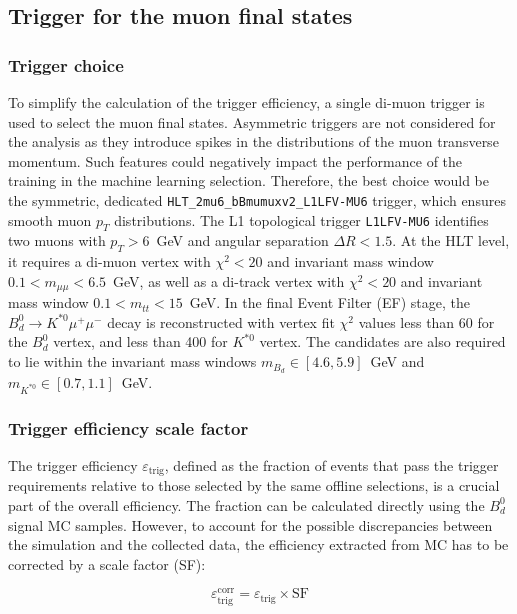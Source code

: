 \subsection{Trigger for the muon final states}

\subsubsection{Trigger choice}
To simplify the calculation of the trigger efficiency, a single di-muon trigger is used to select the muon final states. Asymmetric triggers are not considered for the analysis as they introduce spikes in the distributions of the muon transverse momentum. Such features could negatively impact the performance of the training in the machine learning selection. Therefore, the best choice would be the symmetric, dedicated \texttt{HLT\_2mu6\_bBmumuxv2\_L1LFV-MU6} trigger, which ensures smooth muon $p_T$ distributions.
The L1 topological trigger \texttt{L1LFV-MU6} identifies two muons with $p_T > 6$~GeV and angular separation $\Delta R < 1.5$.
At the HLT level, it requires a di-muon vertex with $\chi^2 < 20$ and invariant mass window $0.1 < m_{\mu\mu} < 6.5$~GeV, as well as a di-track vertex with $\chi^2 < 20$ and invariant mass window $0.1 < m_{tt} < 15$~GeV. In the final Event Filter (EF) stage, the $B^0_d \rightarrow K^{*0} \mu^+ \mu^-$ decay is reconstructed with vertex fit $\chi^2$ values less than 60 for the $B^0_d$ vertex, and less than 400 for $K^{*0}$ vertex. The candidates are also required to lie within the invariant mass windows $m_{B_d} \in [4.6, 5.9]$~GeV and $m_{K^{*0}} \in [0.7, 1.1]$~GeV.

\subsubsection{Trigger efficiency scale factor}

The trigger efficiency $\varepsilon_{\text{trig}}$, defined as the fraction of events that pass the trigger requirements relative to those selected by the same offline selections, is a crucial part of the overall efficiency. The fraction can be calculated directly using the $B^0_d$ signal MC samples. However, to account for the possible discrepancies between the simulation and the collected data, the efficiency extracted from MC has to be corrected by a scale factor (SF):

\begin{equation}
\varepsilon^{\text{corr}}_{\text{trig}} = \varepsilon_{\text{trig}} \times \text{SF}
\end{equation}


